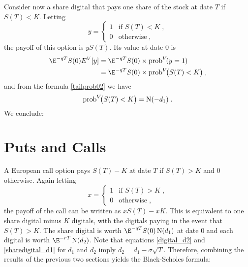 Consider now a share digital that pays one share of the stock at date $T$ if $S(T)<K$.  Letting
\begin{equation*}
y =  \begin{cases} 1 & \text{if $S(T)<K$}\; ,\\
0 & \text{otherwise}\;,
\end{cases}
\end{equation*}
the payoff of this option is $yS(T)$. Its value at date 0 is 
\begin{align*}
\E^{-q T}S(0)E^V [y] &= \E^{-q T}S(0)\times\text{prob}^V\!(y=1) \\
&= \E^{-q T}S(0)\times\text{prob}^V\!\big(S(T)<K\big)\; ,
\end{align*}
and from the formula \eqref{tailprob02} we have
$$\text{prob}^V\!\big(S(T)<K\big) = \operatorname{N}(-d_1)\; .$$
We conclude:

\section{Puts and Calls}\label{s_blackscholes}

A European call option pays $S(T)-K$ at date $T$ if $S(T)>K$ and 0 otherwise.  Again letting
\begin{equation*}
x =  \begin{cases} 1 & \text{if $S(T)>K$}\; ,\\
0 & \text{otherwise}\;,
\end{cases}
\end{equation*}
the payoff of the call can be written as $xS(T)-xK$.  This is equivalent to one share digital minus $K$ digitals, with the digitals paying in the event that $S(T)>K$.  The share digital is worth $\E^{-q T}S(0)\N(d_1)$ at date 0 and each digital is worth $\E^{-rT}\N(d_2)$.  Note that equations \eqref{digital_d2} and \eqref{sharedigital_d1} for $d_1$ and $d_2$ imply $d_2 = d_1-\sigma{\sqrt{T}}$.  Therefore, combining the results of the previous two sections yields the Black-Scholes formula: 


